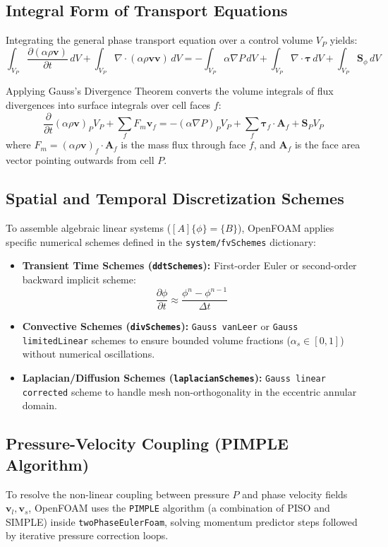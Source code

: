 \documentclass[12pt,a4paper]{article}
\begin{document}
\subsection{Integral Form of Transport Equations}
Integrating the general phase transport equation over a control volume $V_P$ yields:
\begin{equation}
\int_{V_P} \frac{\partial (\alpha \rho \mathbf{v})}{\partial t} \, dV + \int_{V_P} \nabla \cdot (\alpha \rho \mathbf{v} \mathbf{v}) \, dV = -\int_{V_P} \alpha \nabla P \, dV + \int_{V_P} \nabla \cdot \boldsymbol{\tau} \, dV + \int_{V_P} \mathbf{S}_\phi \, dV
\end{equation}

Applying Gauss's Divergence Theorem converts the volume integrals of flux divergences into surface integrals over cell faces $f$:
\begin{equation}
\frac{\partial}{\partial t}(\alpha \rho \mathbf{v})_P V_P + \sum_{f} F_m \mathbf{v}_f = -(\alpha \nabla P)_P V_P + \sum_{f} \boldsymbol{\tau}_f \cdot \mathbf{A}_f + \mathbf{S}_P V_P
\end{equation}
where $F_m = (\alpha \rho \mathbf{v})_f \cdot \mathbf{A}_f$ is the mass flux through face $f$, and $\mathbf{A}_f$ is the face area vector pointing outwards from cell $P$.

\subsection{Spatial and Temporal Discretization Schemes}
To assemble algebraic linear systems ($[A]\{\phi\} = \{B\}$), OpenFOAM applies specific numerical schemes defined in the \texttt{system/fvSchemes} dictionary:
\begin{itemize}
    \item \textbf{Transient Time Schemes (\texttt{ddtSchemes}):} First-order Euler or second-order backward implicit scheme:
    \begin{equation}
    \frac{\partial \phi}{\partial t} \approx \frac{\phi^n - \phi^{n-1}}{\Delta t}
    \end{equation}
    \item \textbf{Convective Schemes (\texttt{divSchemes}):} \texttt{Gauss vanLeer} or \texttt{Gauss limitedLinear} schemes to ensure bounded volume fractions ($\alpha_s \in [0, 1]$) without numerical oscillations.
    \item \textbf{Laplacian/Diffusion Schemes (\texttt{laplacianSchemes}):} \texttt{Gauss linear corrected} scheme to handle mesh non-orthogonality in the eccentric annular domain.
\end{itemize}

\subsection{Pressure-Velocity Coupling (PIMPLE Algorithm)}
To resolve the non-linear coupling between pressure $P$ and phase velocity fields $\mathbf{v}_l, \mathbf{v}_s$, OpenFOAM uses the \texttt{PIMPLE} algorithm (a combination of PISO and SIMPLE) inside \texttt{twoPhaseEulerFoam}, solving momentum predictor steps followed by iterative pressure correction loops.
\end{document}
